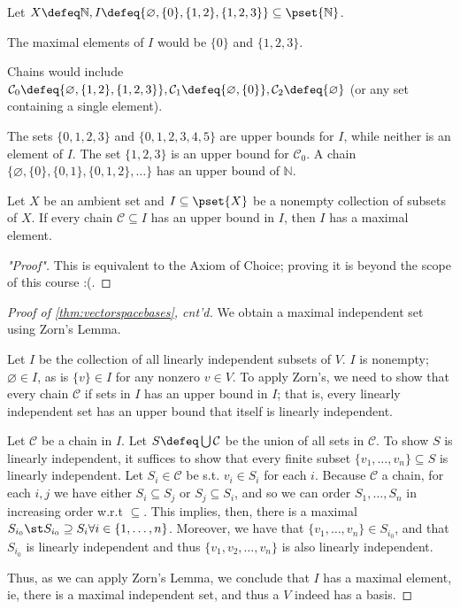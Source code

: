 \begin{example}
    Let $X \defeq \mathbb{N}, I \defeq \{\varnothing, \{0\}, \{1, 2\}, \{1, 2, 3\}\} \subseteq \pset{\mathbb{N}}$.

    The maximal elements of $I$ would be $\{0\}$ and $\{1, 2, 3\}$.

    Chains would include $\mathcal{C}_0 \defeq \{\varnothing, \{1, 2 \}, \{1,2,3\}\}, \mathcal{C}_1 \defeq \{\varnothing, \{0\}\}, \mathcal{C}_2 \defeq \{\varnothing\}$ (or any set containing a single element).

    The sets $\{0, 1, 2, 3\}$ and $\{0, 1, 2, 3, 4, 5\}$ are upper bounds for $I$, while neither is an element of $I$. The set $\{1, 2, 3\}$ is an upper bound for $\mathcal{C}_0$. A chain $\{\varnothing, \{0\}, \{0,1\}, \{0,1,2\}, \dots\}$ has an upper bound of $\mathbb{N}$.
\end{example}

\begin{lemma}\label{lemma:zorns}
    Let $X$ be an ambient set and $I \subseteq \pset{X}$ be a nonempty collection of subsets of $X$. If every chain $\mathcal{C} \subseteq I$ has an upper bound in $I$, then $I$ has a maximal element.
\end{lemma}

\begin{proof}["Proof"]
    This is equivalent to the Axiom of Choice; proving it is beyond the scope of this course :(.
\end{proof}

\begin{proof}[Proof of \cref{thm:vectorspacebases}, cnt'd]
    We obtain a maximal independent set using Zorn's Lemma.

    Let $I$ be the collection of all linearly independent subsets of $V$. $I$ is nonempty; $\varnothing \in I$, as is $\{v\} \in I$ for any nonzero $v \in V$. To apply Zorn's, we need to show that every chain $\mathcal{C}$ if sets in $I$ has an upper bound in $I$; that is, every linearly independent set has an upper bound that itself is linearly independent.

    Let $\mathcal{C}$ be a chain in $I$. Let $S \defeq \bigcup \mathcal{C}$ be the union of all sets in $\mathcal{C}$. To show $S$ is linearly independent, it suffices to show that every finite subset $\{v_1, \dots, v_n\} \subseteq S$ is linearly independent. Let $S_i \in \mathcal{C}$ be s.t. $v_i \in S_i$ for each $i$. Because $\mathcal{C}$ a chain, for each $i,j$ we have either $S_i \subseteq S_j$ or $S_j \subseteq S_i$, and so we can order $S_1, \dots, S_n$ in increasing order w.r.t $\subseteq$. This implies, then, there is a maximal $S_{i_0} \st S_{i_0} \supseteq S_i \forall i \in \{1, \dots, n\}$. Moreover, we have that $\{v_1, \dots, v_n\} \in S_{i_0}$, and that $S_{i_0}$ is linearly independent and thus $\{v_1, v_2, \dots, v_n\}$ is also linearly independent. 

    Thus, as we can apply Zorn's Lemma, we conclude that $I$ has a maximal element, ie, there is a maximal independent set, and thus a $V$ indeed has a basis.
\end{proof}